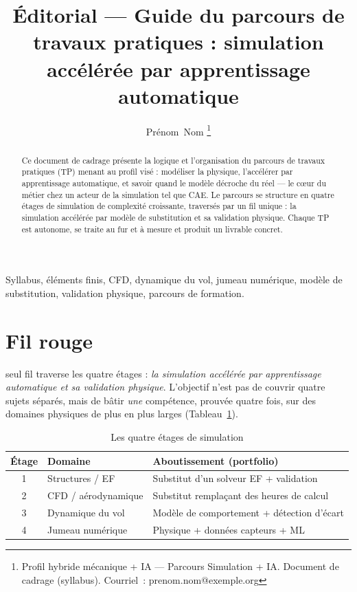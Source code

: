 \documentclass[10pt,journal]{IEEEtran}
\begin{document}
\title{Éditorial --- Guide du parcours de travaux pratiques : simulation accélérée par apprentissage automatique}

\author{Prénom~Nom%
\thanks{Profil hybride mécanique + IA --- Parcours Simulation + IA. Document de cadrage (syllabus). Courriel~: prenom.nom@exemple.org}}


\maketitle

\begin{abstract}
Ce document de cadrage présente la logique et l'organisation du parcours de travaux pratiques (TP) menant au profil visé : modéliser la physique, l'accélérer par apprentissage automatique, et savoir quand le modèle décroche du réel --- le c\oe{}ur du métier chez un acteur de la simulation tel que CAE. Le parcours se structure en quatre étages de simulation de complexité croissante, traversés par un fil unique : la simulation accélérée par modèle de substitution et sa validation physique. Chaque TP est autonome, se traite au fur et à mesure et produit un livrable concret.
\end{abstract}

\begin{IEEEkeywords}
Syllabus, éléments finis, CFD, dynamique du vol, jumeau numérique, modèle de substitution, validation physique, parcours de formation.
\end{IEEEkeywords}

\IEEEpeerreviewmaketitle

\section{Fil rouge}
 seul fil traverse les quatre étages : \emph{la simulation accélérée par apprentissage automatique et sa validation physique}. L'objectif n'est pas de couvrir quatre sujets séparés, mais de bâtir \emph{une} compétence, prouvée quatre fois, sur des domaines physiques de plus en plus larges (Tableau~\ref{tab:etages}).

\begin{table}[!t]
\caption{Les quatre étages de simulation}
\label{tab:etages}
\centering
\begin{tabular}{@{}cll@{}}
\toprule
Étage & Domaine & Aboutissement (portfolio) \\
\midrule
1 & Structures / EF & Substitut d'un solveur EF + validation \\
2 & CFD / aérodynamique & Substitut remplaçant des heures de calcul \\
3 & Dynamique du vol & Modèle de comportement + détection d'écart \\
4 & Jumeau numérique & Physique + données capteurs + ML \\
\bottomrule
\end{tabular}
\end{table}
\end{document}
